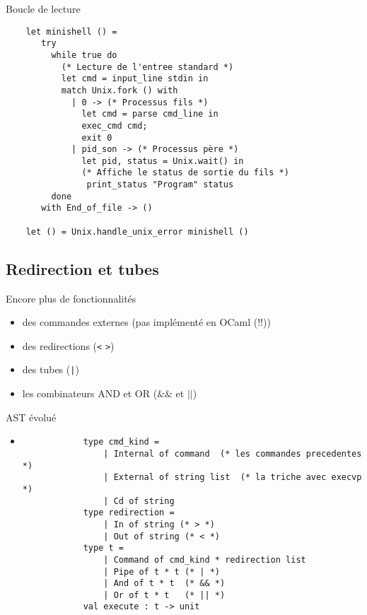 \begin{frame}[fragile]{Boucle de lecture}
\begin{lstlisting}
    let minishell () =
       try
         while true do
           (* Lecture de l'entree standard *)
           let cmd = input_line stdin in
           match Unix.fork () with
             | 0 -> (* Processus fils *)
               let cmd = parse cmd_line in
               exec_cmd cmd;
               exit 0
             | pid_son -> (* Processus père *)
               let pid, status = Unix.wait() in
               (* Affiche le status de sortie du fils *)
                print_status "Program" status
         done
       with End_of_file -> ()

    let () = Unix.handle_unix_error minishell ()
\end{lstlisting}
\end{frame}

\subsection{Redirection et tubes}
\begin{frame}{Encore plus de fonctionnalités}
  \begin{itemize}[label=\small{}]
  \item des commandes externes (pas implémenté en OCaml (!!))
  \item des redirections (\texttt{<} \texttt{>})
  \item des tubes  (\texttt{|})
  \item les combinateurs AND et OR  (\texttt{$\&\&$} et \texttt{$||$})
  \end{itemize}
\end{frame}

\begin{frame}[fragile]{AST évolué}
    \begin{itemize}[leftmargin=-10pt]
         \item
        \begin{lstlisting}
            type cmd_kind =
                | Internal of command  (* les commandes precedentes *)
                | External of string list  (* la triche avec execvp *)
                | Cd of string
            type redirection =
                | In of string (* > *)
                | Out of string (* < *)
            type t =
                | Command of cmd_kind * redirection list
                | Pipe of t * t (* | *)
                | And of t * t  (* && *)
                | Or of t * t   (* || *)
            val execute : t -> unit
        \end{lstlisting}
    \end{itemize}
\end{frame}



